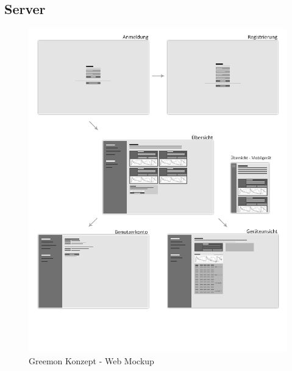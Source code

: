 \documentclass[pointlessnumbers]{scrartcl}
\begin{document}
\subsection{Server}

\begin{figure}[htbp] 
  \centering
     \includegraphics[width=1\textwidth]{wireframe-web.jpg}
  \caption{Greemon Konzept - Web Mockup}
  \label{fig:greemon-web-mockup}
\end{figure}
\end{document}
